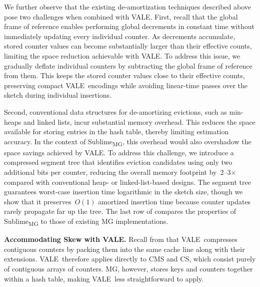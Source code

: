\documentclass[sigconf]{acmart}
\newcommand{\sketch}{Sublime}
\newcommand{\sketchmg}{\sketch\textsubscript{MG}\xspace}
\newcommand{\counterencodingabbrv}{VALE}
\begin{document}
We further observe that the existing de-amortization techniques described above pose two challenges when combined with \counterencodingabbrv.
First, recall that the global frame of reference enables performing global decrements in constant time without immediately updating every individual counter.
As decrements accumulate, stored counter values can become substantially larger than their effective counts, limiting the space reduction achievable with \counterencodingabbrv.
To address this issue, we gradually deflate individual counters by subtracting the global frame of reference from them.
This keeps the stored counter values close to their effective counts, preserving compact \counterencodingabbrv\ encodings while avoiding linear-time passes over the sketch during individual insertions.

Second, conventional data structures for de-amortizing evictions, such as min-heaps and linked lists, incur substantial memory overhead.
This reduces the space available for storing entries in the hash table, thereby limiting estimation accuracy.
In the context of \sketchmg, this overhead would also overshadow the space savings achieved by \counterencodingabbrv.
To address this challenge, we introduce a compressed segment tree that identifies eviction candidates using only two additional bits per counter, reducing the overall memory footprint by~2--3$\times$ compared with conventional heap- or linked-list-based designs.
The segment tree guarantees worst-case insertion time logarithmic in the sketch size, though we show that it preserves~$O(1)$ amortized insertion time because counter updates rarely propagate far up the tree.
The last row of  compares the properties of \sketchmg to those of existing MG implementations.

\textbf{Accommodating Skew with \counterencodingabbrv.}
Recall from  that \counterencodingabbrv\ compresses contiguous counters by packing them into the same cache line along with their extensions.
\counterencodingabbrv\ therefore applies directly to CMS and CS, which consist purely of contiguous arrays of counters.
MG, however, stores keys and counters together within a hash table, making \counterencodingabbrv\ less straightforward to apply.
\end{document}
